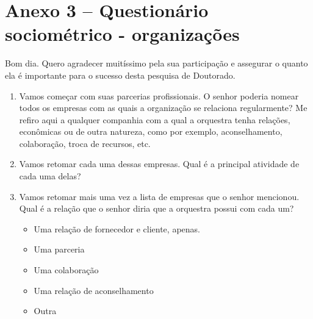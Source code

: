 \documentclass[a4paper, 12pt, openright, oneside, german, french, english, brazil]{abntex2}
\begin{document}
	

	
	
	
	\chapter*[Anexo 3]{Anexo 3 -- Questionário sociométrico - organizações}
	
	
	Bom dia. Quero agradecer muitíssimo pela sua participação e assegurar o quanto ela é importante para o sucesso desta pesquisa de Doutorado.
	
	\vspace{1cm}
	\begin{enumerate}
		
		\item Vamos começar com suas parcerias profissionais. O senhor poderia nomear todos os empresas com as quais a organização se relaciona regularmente? Me refiro aqui a qualquer companhia com a qual a orquestra tenha relações, econômicas ou de outra natureza, como por exemplo, aconselhamento, colaboração, troca de recursos, etc.
		
		
		\item Vamos retomar cada uma dessas empresas. Qual é a principal atividade de cada uma delas?
		
		
		\item Vamos retomar mais uma vez a lista de empresas que o senhor mencionou. Qual é a relação que o senhor diria que a orquestra possui com cada um?
		\begin{itemize}
			\item Uma relação de fornecedor e cliente, apenas.
			\item Uma parceria
			\item Uma colaboração
			\item Uma relação de aconselhamento
			\item Outra
		\end{itemize}
		

\end{enumerate}
\end{document}
